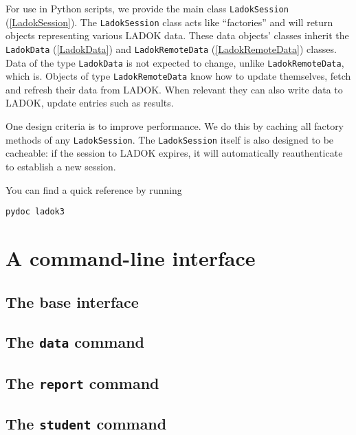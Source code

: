 \documentclass[a4paper,oneside]{memoir}
\begin{document}
For use in Python scripts,
we provide the main class \texttt{LadokSession} (\cref{LadokSession}).
The \texttt{LadokSession} class acts like \enquote{factories} and will return 
objects representing various LADOK data.
These data objects' classes inherit the \texttt{LadokData} (\cref{LadokData}) 
and \texttt{LadokRemoteData} (\cref{LadokRemoteData}) classes.
Data of the type \texttt{LadokData} is not expected to change, unlike 
\texttt{LadokRemoteData}, which is.
Objects of type \texttt{LadokRemoteData} know how to update themselves, \ie fetch 
and refresh their data from LADOK.
When relevant they can also write data to LADOK, \ie update entries such as 
results.

One design criteria is to improve performance.
We do this by caching all factory methods of any \texttt{LadokSession}.
The \texttt{LadokSession} itself is also designed to be cacheable: if the session to 
LADOK expires, it will automatically reauthenticate to establish a new session.

You can find a quick reference by running
\begin{verbatim}
pydoc ladok3
\end{verbatim}



\part{A command-line interface}

\chapter{The base interface}



\chapter{The \texttt{data} command}



\chapter{The \texttt{report} command}



\chapter{The \texttt{student} command}
\end{document}
